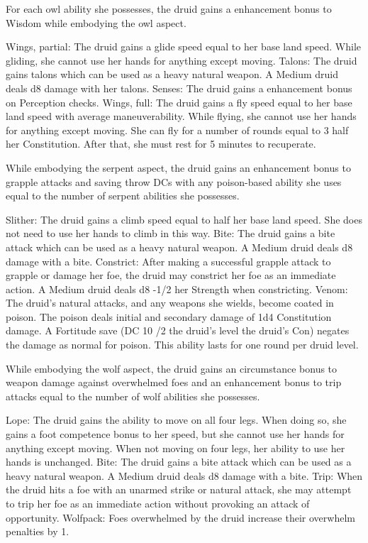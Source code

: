 For each owl ability she possesses, the druid gains a  enhancement bonus to Wisdom  while embodying the owl aspect.
\begin{wildaspect}
\wilditem Wings, partial: The druid gains a glide speed equal to her base land speed. While gliding, she cannot use her hands for anything except moving.
\wilditem Talons: The druid gains talons which can be used as a heavy natural weapon. A Medium druid deals d8 damage with her talons.
\wilditem Senses: The druid gains a  enhancement bonus on Perception checks.
\wilditem Wings, full: The druid gains a fly speed equal to her base land speed with average maneuverability. While flying, she cannot use her hands for anything except moving. She can fly for a number of rounds equal to 3 \add half her Constitution. After that, she must rest for 5 minutes to recuperate.
\end{wildaspect}

While embodying the serpent aspect, the druid gains an enhancement bonus to grapple attacks and saving throw DCs with any poison-based ability she uses equal to the number of serpent abilities she possesses.
\begin{wildaspect}
\wilditem Slither: The druid gains a climb speed equal to half her base land speed. She does not need to use her hands to climb in this way.
\wilditem Bite: The druid gains a bite attack which can be used as a heavy natural weapon. A Medium druid deals d8 damage with a bite.
\wilditem Constrict: After making a successful grapple attack to grapple or damage her foe, the druid may constrict her foe as an immediate action. A Medium druid deals d8 -1/2 her Strength when constricting.
\wilditem Venom: The druid's natural attacks, and any weapons she wields, become coated in poison. The poison deals initial and secondary damage of 1d4 Constitution damage. A Fortitude save (DC 10 /2 the druid's level \add the druid's Con) negates the damage as normal for poison. This ability lasts for one round per druid level.
\end{wildaspect}

While embodying the wolf aspect, the druid gains an circumstance bonus to weapon damage against overwhelmed foes and an enhancement bonus to trip attacks equal to the number of wolf abilities she possesses.
\begin{wildaspect}
\wilditem Lope: The druid gains the ability to move on all four legs. When doing so, she gains a  foot competence bonus to her speed, but she cannot use her hands for anything except moving. When not moving on four legs, her ability to use her hands is unchanged.
\wilditem Bite: The druid gains a bite attack which can be used as a heavy natural weapon. A Medium druid deals d8 damage with a bite.
\wilditem Trip: When the druid hits a foe with an unarmed strike or natural attack, she may attempt to trip her foe as an immediate action without provoking an attack of opportunity.
\wilditem Wolfpack: Foes overwhelmed by the druid increase their overwhelm penalties by 1.
\end{wildaspect}

